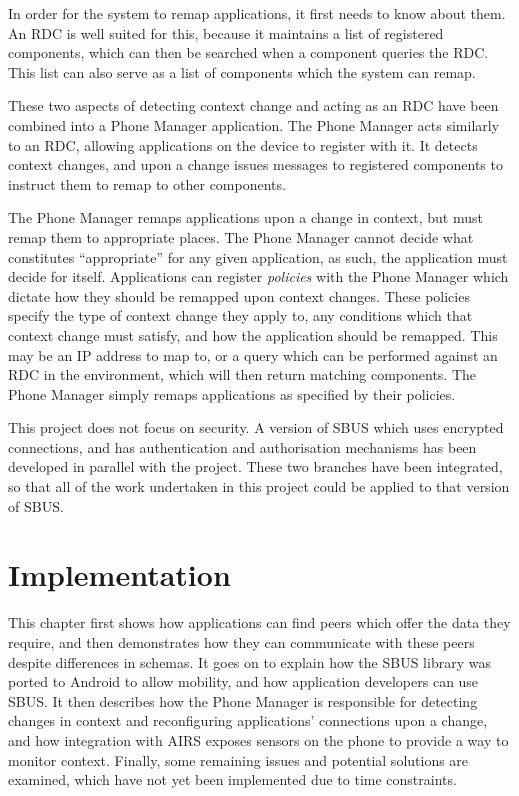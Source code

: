 \documentclass[12pt,twoside,notitlepage]{report}
\begin{document}
In order for the system to remap applications, it first needs to know about them. 
An RDC is well suited for this, because it maintains a list of registered components, which can then be searched when a component queries the RDC. 
This list can also serve as a list of components which the system can remap.

These two aspects of detecting context change and acting as an RDC have been combined into a Phone Manager application. 
The Phone Manager acts similarly to an RDC, allowing applications on the device to register with it. 
It detects context changes, and upon a change issues messages to registered components to instruct them to remap to other components.

The Phone Manager remaps applications upon a change in context, but must remap them to appropriate places. 
The Phone Manager cannot decide what constitutes ``appropriate'' for any given application, as such, the application must decide for itself. 
Applications can register {\sl policies} with the Phone Manager which dictate how they should be remapped upon context changes. 
These policies specify the type of context change they apply to, any conditions which that context change must satisfy, and how the application should be remapped. 
This may be an IP address to map to, or a query which can be performed against an RDC in the environment, which will then return matching components. 
The Phone Manager simply remaps applications as specified by their policies.

This project does not focus on security. 
A version of SBUS which uses encrypted connections, and has authentication and authorisation mechanisms has been developed in parallel with the project. 
These two branches have been integrated, so that all of the work undertaken in this project could be applied to that version of SBUS.

\cleardoublepage


\chapter{Implementation}

This chapter first shows how applications can find peers which offer the data they require, and then demonstrates how they can communicate with these peers despite differences in schemas. 
It goes on to explain how the SBUS library was ported to Android to allow mobility, and how application developers can use SBUS. 
It then describes how the Phone Manager is responsible for detecting changes in context and reconfiguring applications' connections upon a change, and how integration with AIRS exposes sensors on the phone to provide a way to monitor context. 
Finally, some remaining issues and potential solutions are examined, which have not yet been implemented due to time constraints. 
\end{document}
